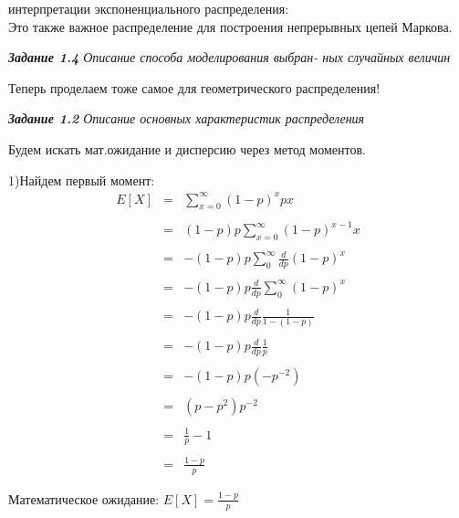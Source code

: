 \documentclass[a4paper,12pt, oneside]{article}
\begin{document}
\vspace{\baselineskip}
{ интерпретации} экспоненциального распределения:\\
Это также важное распределение для построения непрерывных цепей Маркова.

\vspace{13mm}%
\textit{\textbf{Задание 1.4} Описание способа моделирования выбран-
	ных случайных величин}
\vspace{13mm}


{\large Теперь проделаем тоже самое для геометрического распределения!}
\vspace{\baselineskip}
\vspace{\baselineskip}

\vspace{13mm}%
\textit{\textbf{Задание 1.2} Описание основных характеристик распределения}
\vspace{13mm}


Будем искать мат.ожидание и дисперсию через метод моментов.

\vspace{\baselineskip}
1)Найдем первый момент:
$$
\begin{array}{rcl}
E[X] &=& \sum\limits_{x=0}^{\infty} (1-p)^x px \\
\\
&=&(1-p)p \sum\limits_{x=0}^{\infty} (1-p)^{x-1} x\\
\\
&=&-(1-p)p \sum\limits_{0}^{\infty} \frac{d}{dp} (1-p)^x\\
\\
&=&-(1-p)p \frac{d}{dp} \sum\limits_{0}^{\infty} (1-p)^x\\
\\
&=&-(1-p)p\frac{d}{dp} \frac{1}{1-(1-p)}\\
\\
&=&-(1-p)p\frac{d}{dp} \frac{1}{p}\\
\\
&=&-(1-p)p(-p^{-2})\\
\\
&=&(p-p^2)p^{-2}\\
\\
&=&\frac{1}{p} - 1\\
\\
&=& \frac{1-p}{p}
\end{array}
$$

Математическое ожидание: $E[X] = \frac{1-p}{p} $
\end{document}
